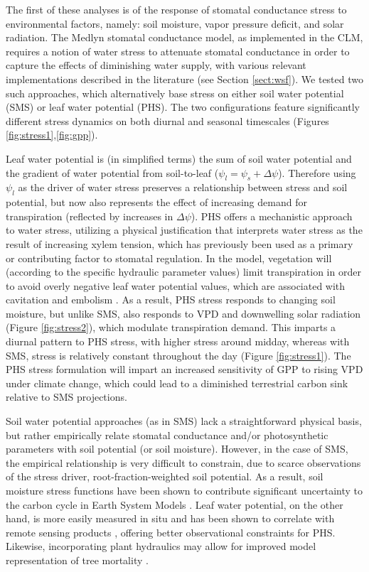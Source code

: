 \documentclass[draft,linenumbers]{agujournal}
\begin{document}
    The first of these analyses is of the response of stomatal conductance stress to environmental factors, namely: soil moisture, vapor pressure deficit, and solar radiation.
    The Medlyn stomatal conductance model, as implemented in the CLM, requires a notion of water stress to attenuate stomatal conductance in order to capture the effects of diminishing water supply,
    with various relevant implementations described in the literature (see Section \ref{sect:wsf}).
    We tested two such approaches, which alternatively base stress on either soil water potential (SMS) or leaf water potential (PHS).
    The two configurations feature significantly different stress dynamics on both diurnal and seasonal timescales (Figures \ref{fig:stress1},\ref{fig:gpp}).     
        
    Leaf water potential is (in simplified terms) the sum of soil water potential and the gradient of water potential from soil-to-leaf ($\psi_l=\psi_s+\Delta\psi$).
    Therefore using $\psi_l$ as the driver of water stress preserves a relationship between stress and soil potential, but now also represents the effect of increasing demand for transpiration (reflected by increases in $\Delta\psi$).
PHS offers a mechanistic approach to water stress, utilizing a physical justification that interprets water stress as the result of increasing xylem tension, which has previously been used as a primary \citep{sperry2017} or contributing \citep{novick2016a} factor to stomatal regulation.
    In the model, vegetation will (according to the specific hydraulic parameter values) limit transpiration in order to avoid overly negative leaf water potential values, which are associated with cavitation and embolism \citep{tyree1989}.
    As a result, PHS stress responds to changing soil moisture, but unlike SMS, also responds to VPD and downwelling solar radiation (Figure \ref{fig:stress2}), which modulate transpiration demand.
        This imparts a diurnal pattern to PHS stress, with higher stress around midday, whereas with SMS, stress is relatively constant throughout the day (Figure \ref{fig:stress1}).
The PHS stress formulation will impart an increased sensitivity of GPP to rising VPD under climate change, which could lead to a diminished terrestrial carbon sink relative to SMS projections.

   
    Soil water potential approaches (as in SMS) lack a straightforward physical basis, but rather empirically relate stomatal conductance and/or photosynthetic parameters with soil potential (or soil moisture).
    However, in the case of SMS, the empirical relationship is very difficult to constrain, due to scarce observations of the stress driver, root-fraction-weighted soil potential.
    As a result, soil moisture stress functions have been shown to contribute significant uncertainty to the carbon cycle in Earth System Models \citep{trugman2018}.
    Leaf water potential, on the other hand, is more easily measured in situ \citep{boyer1967} and has been shown to correlate with remote sensing products \citep{momen2017}, offering better observational constraints for PHS.
    Likewise, incorporating plant hydraulics may allow for improved model representation of tree mortality \citep{mcdowell2018}.
\end{document}
